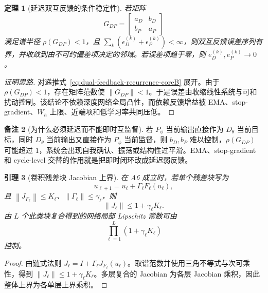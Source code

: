 \documentclass[11pt,a4paper,UTF8,fontset=fandol]{ctexart}
\newtheorem{theorem}{定理}[section]
\newtheorem{lemma}[theorem]{引理}
\theoremstyle{definition}
\newtheorem{remark}[theorem]{备注}
\newcommand{\norm}[1]{\left\lVert#1\right\rVert}
\begin{document}
\begin{theorem}[延迟双互反馈的条件稳定性]
\label{thm:dual-feedback-stability-coreB}
若矩阵
\begin{equation}
    G_{DP}=\begin{bmatrix}a_D & b_D\\ b_P & a_P\end{bmatrix}
\end{equation}
满足谱半径 $\rho(G_{DP})<1$，且 $\sum_k(\epsilon_D^{(k)}+\epsilon_P^{(k)})<\infty$，则双互反馈误差序列有界，并收敛到由不可约偏差项决定的邻域。若误差项趋于零，则 $e_D^{(k)},e_P^{(k)}\to0$。
\end{theorem}

\begin{proof}[证明思路]
对递推式~\eqref{eq:dual-feedback-recurrence-coreB} 展开。由于 $\rho(G_{DP})<1$，存在矩阵范数使 $\norm{G_{DP}}<1$。于是误差由收缩线性系统与可和扰动控制。该结论不依赖深度网络全局凸性，而依赖反馈增益被 EMA、stop-gradient、$W_h$ 上限、近端项和低学习率共同压低。
\end{proof}

\begin{remark}[为什么必须延迟而不能即时互监督]
若 $P_\phi$ 当前输出直接作为 $D_\theta$ 当前目标，同时 $D_\theta$ 当前输出又直接作为 $P_\phi$ 当前监督，则 $b_D,b_P$ 难以控制，$\rho(G_{DP})$ 可能超过 $1$，系统会出现自我确认、振荡或结构性过平滑。EMA、stop-gradient 和 cycle-level 交替的作用就是把即时闭环改成延迟弱反馈。
\end{remark}

\label{sec:main-results}

\begin{lemma}[卷积残差块 Jacobian 上界]
\label{lem:residual-block}
在 A6 成立时，若单个残差块写为
\begin{equation}
    u_{\ell+1}=u_\ell+\Gamma_\ell F_\ell(u_\ell),
\end{equation}
且 $\norm{J_{F_\ell}}\le K_\ell$、$\norm{\Gamma_\ell}\le\gamma_\ell$，则
\begin{equation}
    \norm{J_\ell}\le 1+\gamma_\ell K_\ell.
\end{equation}
由 $L$ 个此类块复合得到的网络局部 Lipschitz 常数可由
\begin{equation}
    \prod_{\ell=1}^L(1+\gamma_\ell K_\ell)
\end{equation}
控制。
\end{lemma}

\begin{proof}
由链式法则 $J_\ell=I+\Gamma_\ell J_{F_\ell}(u_\ell)$。取谱范数并使用三角不等式与次可乘性，得到 $\norm{J_\ell}\le1+\gamma_\ell K_\ell$。多层复合的 Jacobian 为各层 Jacobian 乘积，因此整体上界为各单层上界乘积。
\end{proof}
\end{document}
